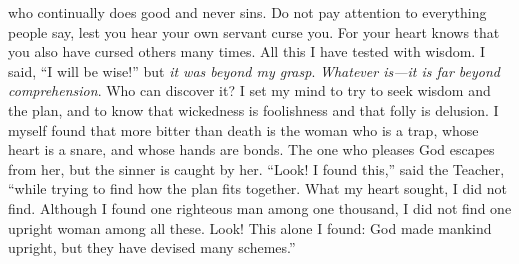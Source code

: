 \begin{biblechapter}
who continually does good and never sins.
\verse Do not pay attention to everything people say, 
lest you hear your own servant curse you.
\verse For your heart knows 
that you also have cursed others many times.
 All this I have tested with wisdom. I said, “I will be wise!” but \textit{it was beyond my grasp}.
\verse \textit{Whatever is—it is far beyond comprehension}. Who can discover it?
\verse I set my mind to try to seek wisdom and the plan, and to know that wickedness is foolishness and that folly is delusion.
\verse I myself found that more bitter than death is the woman who is a trap, whose heart is a snare, and whose hands are bonds. The one who pleases God escapes from her, but the sinner is caught by her.
\verse “Look! I found this,” said the Teacher, “while trying to find how the plan fits together.
\verse What my heart sought, I did not find. Although I found one righteous man among one thousand, I did not find one upright woman among all these.
\verse Look! This alone I found: God made mankind upright, but they have devised many schemes.”
\end{biblechapter}


